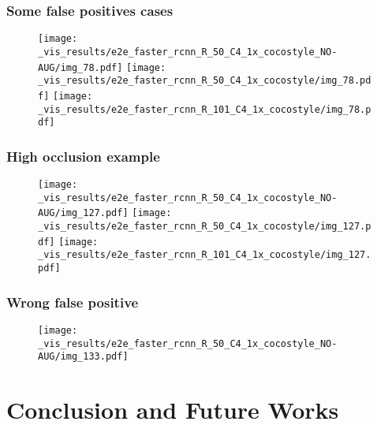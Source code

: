 \documentclass{beamer}
\begin{document}
		\begin{frame}\frametitle{Some false positives cases}
			\begin{figure}[htb!]
				\centering
				\texttt{[image: \_vis\_results/e2e\_faster\_rcnn\_R\_50\_C4\_1x\_cocostyle\_NO-AUG/img\_78.pdf]}
				\texttt{[image: \_vis\_results/e2e\_faster\_rcnn\_R\_50\_C4\_1x\_cocostyle/img\_78.pdf]}
				\vspace{.1mm}
				\texttt{[image: \_vis\_results/e2e\_faster\_rcnn\_R\_101\_C4\_1x\_cocostyle/img\_78.pdf]}
				\label{fig:FP_cases}
			\end{figure}
		\end{frame}


		\begin{frame}\frametitle{High occlusion example}
			\begin{figure}[htb!]
				\centering
				\texttt{[image: \_vis\_results/e2e\_faster\_rcnn\_R\_50\_C4\_1x\_cocostyle\_NO-AUG/img\_127.pdf]}
				\texttt{[image: \_vis\_results/e2e\_faster\_rcnn\_R\_50\_C4\_1x\_cocostyle/img\_127.pdf]}
				\vspace{.1mm}
				\texttt{[image: \_vis\_results/e2e\_faster\_rcnn\_R\_101\_C4\_1x\_cocostyle/img\_127.pdf]}
  			\label{fig:occlusion}
			\end{figure}
		\end{frame}


		\begin{frame}\frametitle{Wrong false positive}
			\begin{figure}[h!]
				\centering
				\texttt{[image: \_vis\_results/e2e\_faster\_rcnn\_R\_50\_C4\_1x\_cocostyle\_NO-AUG/img\_133.pdf]}
				\label{fig:wrong_fp}
			\end{figure}
		\end{frame}

	\section{Conclusion and Future Works}
\end{document}
